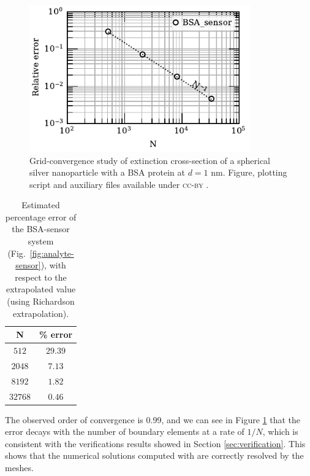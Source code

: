 \begin{figure}%
    \centering
    \includegraphics[width=0.85\textwidth]{convergence_bsa_sensor_R8_d1_w380.pdf} 
    \caption{Grid-convergence study of extinction cross-section of a spherical silver
             nanoparticle with a BSA protein at $d=1$ nm. 
             Figure, plotting script and auxiliary files available 
             under \textsc{cc-by} \cite{ClementiETal2018c}.}
    \label{fig:err_sph-bsa}
 \end{figure}

 \begin{table}%
    \centering
    \caption{\label{table:err_sph-bsa} Estimated percentage error of the BSA-sensor 
    system (Fig.~\ref{fig:analyte-sensor}), with respect to the extrapolated value 
    (using Richardson extrapolation).} 
    \begin{tabular}{c c}
    \hline%
    N & \% error \\
    \hline%
     $512$ & $29.39$ \\
     $2048$ & $7.13$ \\
     $8192$ & $1.82$ \\
     $32768$ & $0.46$ \\
    \hline%
    \end{tabular}
\end{table}

The observed order of convergence is 0.99, and we can see in Figure
\ref{fig:err_sph-bsa} that the error decays with the number of boundary elements
at a rate of $1/N$, which is consistent with the verifications results showed
in Section \ref{sec:verification}. This shows that the numerical solutions computed
with \pygbe are correctly resolved by the meshes.

